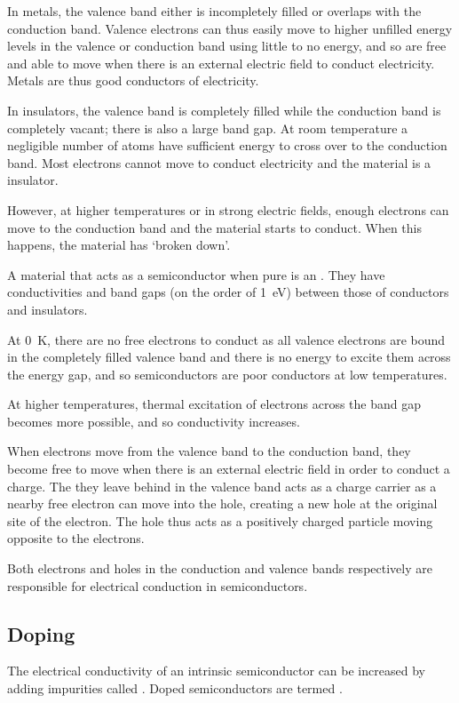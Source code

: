 \documentclass[Physics.tex]{subfiles}
\begin{document}
In metals, the valence band either is incompletely filled or overlaps with the conduction band. Valence electrons can thus easily move to higher unfilled energy levels in the valence or conduction band using little to no energy, and so are free and able to move when there is an external electric field to conduct electricity. Metals are thus good conductors of electricity.

In insulators, the valence band is completely filled while the conduction band is completely vacant; there is also a large band gap. At room temperature a negligible number of atoms have sufficient energy to cross over to the conduction band. Most electrons cannot move to conduct electricity and the material is a insulator.

However, at higher temperatures or in strong electric fields, enough electrons can move to the conduction band and the material starts to conduct. When this happens, the material has `broken down'.

A material that acts as a semiconductor when pure is an . They have conductivities and band gaps (on the order of \SI{1}{\electronvolt}) between those of conductors and insulators.

At \SI{0}{\kelvin}, there are no free electrons to conduct as all valence electrons are bound in the completely filled valence band and there is no energy to excite them across the energy gap, and so semiconductors are poor conductors at low temperatures.

At higher temperatures, thermal excitation of electrons across the band gap becomes more possible, and so conductivity increases.

When electrons move from the valence band to the conduction band, they become free to move when there is an external electric field in order to conduct a charge. The  they leave behind in the valence band acts as a charge carrier as a nearby free electron can move into the hole, creating a new hole at the original site of the electron. The hole thus acts as a positively charged particle moving opposite to the electrons.

Both electrons and holes in the conduction and valence bands respectively are responsible for electrical conduction in semiconductors.
\subsection{Doping}
The electrical conductivity of an intrinsic semiconductor can be increased by adding impurities called . Doped semiconductors are termed .
\end{document}
